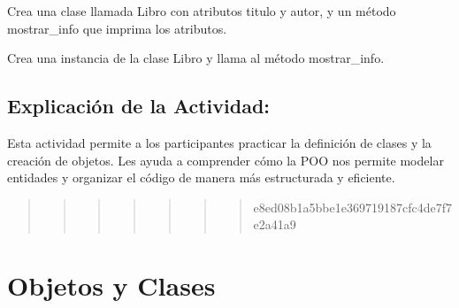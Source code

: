 \documentclass[
  a4paper,
  DIV=11,
  numbers=noendperiod,
  onepage,
  openany]{scrreprt}
\begin{document}
\begin{tcolorbox}[enhanced jigsaw, colbacktitle=quarto-callout-important-color!10!white, toprule=.15mm, leftrule=.75mm, titlerule=0mm, opacityback=0, rightrule=.15mm, opacitybacktitle=0.6, breakable, left=2mm, coltitle=black, title=\textcolor{quarto-callout-important-color}{\faExclamation}\hspace{0.5em}{Actividad Práctica:}, toptitle=1mm, bottomtitle=1mm, arc=.35mm, bottomrule=.15mm, colback=white, colframe=quarto-callout-important-color-frame]

Crea una clase llamada Libro con atributos titulo y autor, y un método
mostrar\_info que imprima los atributos.

Crea una instancia de la clase Libro y llama al método mostrar\_info.

\end{tcolorbox}

\hypertarget{explicaciuxf3n-de-la-actividad-47}{%
\section{Explicación de la
Actividad:}\label{explicaciuxf3n-de-la-actividad-47}}

Esta actividad permite a los participantes practicar la definición de
clases y la creación de objetos. Les ayuda a comprender cómo la POO nos
permite modelar entidades y organizar el código de manera más
estructurada y eficiente.

\begin{quote}
\begin{quote}
\begin{quote}
\begin{quote}
\begin{quote}
\begin{quote}
\begin{quote}
e8ed08b1a5bbe1e369719187cfc4de7f7e2a41a9
\end{quote}
\end{quote}
\end{quote}
\end{quote}
\end{quote}
\end{quote}
\end{quote}

\hypertarget{objetos-y-clases}{%
\chapter{Objetos y Clases}\label{objetos-y-clases}}
\end{document}

